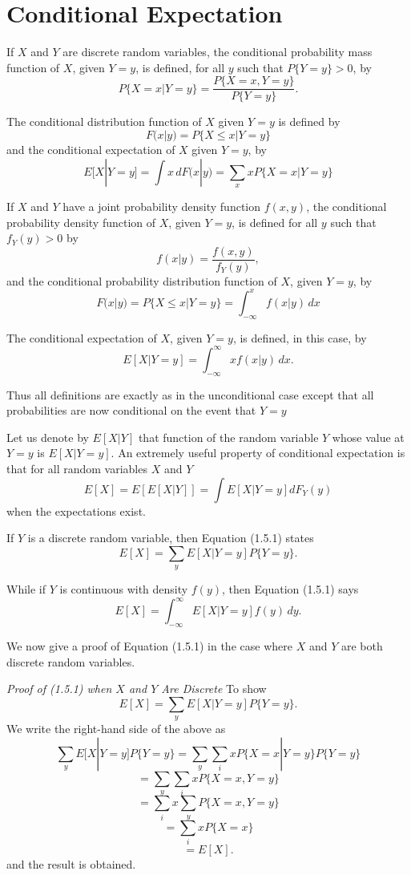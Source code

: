 \documentclass[lang=cn,10pt,thmcnt=section]{elegantbook}
\begin{document}
\section{Conditional Expectation}
If $X$ and $Y$ are discrete random variables, the conditional probability mass function of $X$, given $Y = y$, is defined, for all $y$ such that $P\{Y = y\} > 0$, by
\[
P\{X = x | Y = y\} = \frac{P\{X = x, Y = y\}}{P\{Y = y\}}.
\]

The conditional distribution function of $X$ given $Y = y$ is defined by
\[
F(x|y) = P\{X \leq x | Y = y\}
\]
and the conditional expectation of $X$ given $Y = y$, by
\[
E[X | Y = y] = \int x \, dF(x|y) = \sum_x x P\{X = x | Y = y\}
\]

If $X$ and $Y$ have a joint probability density function $f(x, y)$, the conditional probability density function of $X$, given $Y = y$, is defined for all $y$ such that $f_Y(y) > 0$ by
\[
f(x|y) = \frac{f(x, y)}{f_Y(y)},
\]
and the conditional probability distribution function of $X$, given $Y = y$, by
\[
F(x|y) = P\{X \leq x | Y = y\} = \int_{-\infty}^x f(x|y) \, dx
\]

The conditional expectation of $X$, given $Y = y$, is defined, in this case, by
\[
E[X | Y = y] = \int_{-\infty}^\infty x f(x|y) \, dx.
\]

Thus all definitions are exactly as in the unconditional case except that all probabilities are now conditional on the event that $Y = y$

Let us denote by $E[X | Y]$ that function of the random variable $Y$ whose value at $Y = y$ is $E[X | Y = y]$. An extremely useful property of conditional expectation is that for all random variables $X$ and $Y$
\begin{equation}
E[X] = E[E[X | Y]] = \int E[X | Y = y] dF_Y(y)
\end{equation}
when the expectations exist.

If $Y$ is a discrete random variable, then Equation (1.5.1) states
\[
E[X] = \sum_y E[X | Y = y] P\{Y = y\}.
\]

While if $Y$ is continuous with density $f(y)$, then Equation (1.5.1) says
\[
E[X] = \int_{-\infty}^\infty E[X | Y = y] f(y) \, dy.
\]

We now give a proof of Equation (1.5.1) in the case where $X$ and $Y$ are both discrete random variables.

\textit{Proof of (1.5.1) when $X$ and $Y$ Are Discrete} To show
\[
E[X] = \sum_y E[X | Y = y] P\{Y = y\}.
\]
We write the right-hand side of the above as
\[
\sum_y E[X | Y = y] P\{Y = y\} = \sum_y \sum_i x P\{X = x | Y = y\} P\{Y = y\}
\]
\[
= \sum_y \sum_i x P\{X = x, Y = y\}
\]
\[
= \sum_i x \sum_y P\{X = x, Y = y\}
\]
\[
= \sum_i x P\{X = x\}
\]
\[
= E[X].
\]
and the result is obtained.
\end{document}
